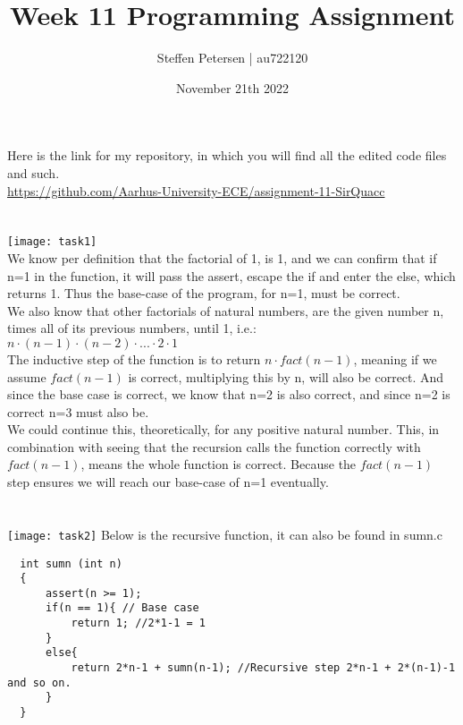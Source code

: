 \documentclass{article}
\title{Week 11 Programming Assignment}
\author{Steffen Petersen | au722120}
\date{November 21th 2022}
\begin{document}

\maketitle
\vspace{5pt}
\noindent Here is the link for my repository, in which you will find all the edited code files and such.\\
\url{https://github.com/Aarhus-University-ECE/assignment-11-SirQuacc}
\section{}
\texttt{[image: task1]}
\vspace{2pt}\\
We know per definition that the factorial of 1, is 1, and we can confirm that if n=1 in the function, it will pass the assert,
escape the if and enter the else, which returns 1. Thus the base-case of the program, for n=1, must be correct.\\
We also know that other factorials of natural numbers, are the given number n, times all of its previous numbers, until 1, i.e.:\\
$n \cdot (n-1) \cdot (n-2) \cdot ... \cdot 2 \cdot 1$\\
The inductive step of the function is to return $n \cdot fact(n-1)$, meaning if we assume $fact(n-1)$ is correct, multiplying this
by n, will also be correct. And since the base case is correct, we know that n=2 is also correct, and since n=2 is correct n=3 must also be.\\
We could continue this, theoretically, for any positive natural number. This, in combination with seeing that the recursion calls 
the function correctly with $fact(n-1)$, means the whole function is correct. Because the $fact(n-1)$ step ensures we will reach our
base-case of n=1 eventually.


\section{}
\texttt{[image: task2]}
\vspace{2pt}
Below is the recursive function, it can also be found in sumn.c
\begin{lstlisting}
  int sumn (int n)
  {
      assert(n >= 1);
      if(n == 1){ // Base case
          return 1; //2*1-1 = 1
      }
      else{
          return 2*n-1 + sumn(n-1); //Recursive step 2*n-1 + 2*(n-1)-1 and so on.
      }
  }
\end{lstlisting}
\end{document}
